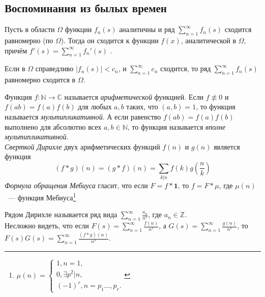 \subsection{Воспоминания из былых времен}
\begin{theorem}[Вейерштрасса] \label{l2_th_Weierstrass}
	Пусть в области $\Omega$ функции $f_n(s)$ аналитичны и ряд $\displaystyle \sum\limits_{n=1}^\infty f_n(s)$ сходится равномерно (по $\Omega$). Тогда он сходится к функции $f(x)$, аналитической в $\Omega$, причём $\displaystyle f'(s) = \sum\limits_{n=1}^\infty f_n'(s)$ .
\end{theorem}

\begin{test}[Вейерштрасса]
	Если в $\Omega$ справедливо $|f_n(s)| < c_n$, и $\displaystyle \sum\limits_{n=1}^\infty c_n$ сходится, то ряд
	$\displaystyle \sum\limits_{n=1}^\infty f_n(s)$ равномерно сходится в $\Omega$.
\end{test}
\begin{definition}
	Функция $f: \mathbb{N} \rightarrow \mathbb{C}$ называется \textit{арифметической} функцией.
    Если $f \not\equiv 0$ и $f(ab) = f(a) f(b)$ для любых $a, b$ таких, что $(a, b) = 1$, то функция называется \textit{мультипликативной}.
	А если равенство $f(ab) = f(a) f(b)$ выполнено для абсолютно всех $a, b \in \mathbb{N}$, то функция называется \textit{вполне мультипликативной}.\\
    \textit{Сверткой Дирихле} двух арифметических функций $f(n)$ и $g(n)$ является функция
    $$\displaystyle (f \ast g)(n) = (g \ast f)(n) =  \sum_{k | n} f(k) g\left(\frac{n}{k}\right)$$
    \textit{Формула обращения Мебиуса} гласит, что если $F = f \ast \textbf{1}$, то $f = F \ast \mu$, где $\mu(n)$ — функция Мебиуса\footnote{$\mu(n) =
    \begin{cases}
	     1, n = 1, \\
	 0, \exists p^2 | n, \\
	(-1)^r, n = p_1 \ldots, p_r.
	\end{cases}$}
\end{definition}

\begin{definition}
	Рядом Дирихле называется ряд вида $\displaystyle \sum\limits_{n=1}^\infty \frac{a_n}{n^s}$, где $a_n \in \mathbb{Z}$.\\
	Несложно видеть, что если $\displaystyle F(s) = \sum_{n = 1}^{\infty} \frac{f(n)}{n^s}$, а $\displaystyle G(s) = \sum_{n = 1}^{\infty} \frac{g(n)}{n^s}$, то $\displaystyle F(s) G(s) = \sum_{n = 1}^{\infty} \frac{(f \ast g)(n)}{n^s}$.
\end{definition}

